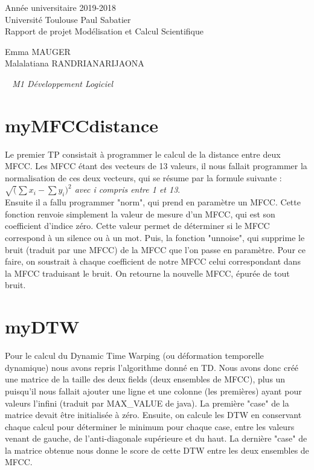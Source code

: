 \documentclass[a4paper,12pt]{article}
\begin{document}
\begin{center}
	
		\Large{Année universitaire 2019-2018}\\
		\Large{Université Toulouse Paul Sabatier}\\[1cm]
		
		\huge{Rapport de projet Modélisation et Calcul Scientifique}\\
		\vspace{3cm}
		
		Emma MAUGER\\
		Malalatiana RANDRIANARIJAONA
		
	\normalsize{\textit{ ~ M1 Développement Logiciel}}\\
		\medskip
		\vspace{2cm}
		
	\end{center}

\newpage
\tableofcontents
{}
\newpage

\section{myMFCCdistance}

Le premier TP consistait à programmer le calcul de la distance entre deux MFCC. Les MFCC étant des vecteurs de 13 valeurs, il nous fallait programmer la normalisation de ces deux vecteurs, qui se résume par la formule suivante : \emph{$\sqrt({\sum{x_i} - \sum{y_i})^2}$ avec i compris entre 1 et 13}.\\
Ensuite il a fallu programmer "norm", qui prend en paramètre un MFCC. Cette fonction renvoie simplement la valeur de mesure d'un MFCC, qui est son coefficient d'indice zéro. Cette valeur permet de déterminer si le MFCC correspond à un silence ou à un mot.
Puis, la fonction "unnoise", qui supprime le bruit (traduit par une MFCC) de la MFCC que l'on passe en paramètre. Pour ce faire, on soustrait à chaque coefficient de notre MFCC celui correspondant dans la MFCC traduisant le bruit. On retourne la nouvelle MFCC, épurée de tout bruit.

\section{myDTW}

Pour le calcul du Dynamic Time Warping (ou déformation temporelle dynamique) nous avons repris l'algorithme donné en TD. Nous avons donc créé une matrice de la taille des deux fields (deux ensembles de MFCC), plus un puisqu'il nous fallait ajouter une ligne et une colonne (les premières) ayant pour valeurs l'infini (traduit par MAX\_VALUE de java). La première "case" de la matrice devait être initialisée à zéro.
Ensuite, on calcule les DTW en conservant chaque calcul pour déterminer le minimum pour chaque case, entre les valeurs venant de gauche, de l'anti-diagonale supérieure et du haut. La dernière "case" de la matrice obtenue nous donne le score de cette DTW entre les deux ensembles de MFCC.
\end{document}
